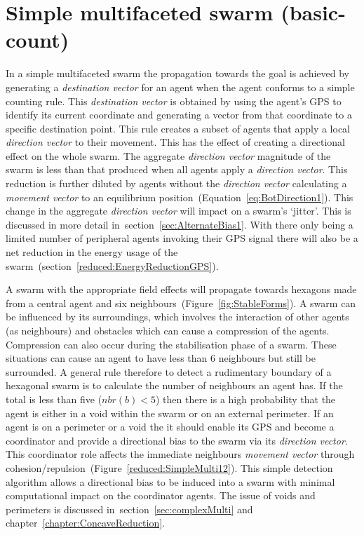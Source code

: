 \section{Simple multifaceted swarm (basic-count)} 
In a simple multifaceted swarm the propagation towards the goal is achieved by generating a \textit{destination vector} for an agent when the agent conforms to a simple counting rule. This \textit{destination vector} is obtained by using the agent's GPS to identify its current coordinate and generating a vector from that coordinate to a specific destination point. This rule creates a subset of agents that apply a local \textit{direction vector} to their movement. This has the effect of creating a directional effect on the whole swarm. The aggregate \textit{direction vector} magnitude of the swarm is less than that produced when all agents apply a \textit{direction vector}. This reduction is further diluted by agents without the \textit{direction vector} calculating a \textit{movement vector} to an equilibrium position~(Equation~\ref{eq:BotDirection1}). This change in the aggregate \textit{direction vector} will impact on a swarm's `jitter'. This is discussed in more detail in~section~\ref{sec:AlternateBias1}. With there only being a limited number of peripheral agents invoking their GPS signal there will also be a net reduction in the energy usage of the swarm~(section~\ref{reduced:EnergyReductionGPS}).

A swarm with the appropriate field effects will propagate towards hexagons made from a central agent and six neighbours~(Figure~\ref{fig:StableForms}). A swarm can be influenced by its surroundings, which involves the interaction of other agents (as neighbours) and obstacles which can cause a compression of the agents. Compression can also occur during the stabilisation phase of a swarm. These situations can cause an agent to have less than 6 neighbours but still be surrounded. A general rule therefore to detect a rudimentary boundary of a hexagonal swarm is to calculate the number of neighbours an agent has. If the total is less than five ($nbr(b) < 5$) then there is a high probability that the agent is either in a void within the swarm or on an external perimeter. If an agent is on a perimeter or a void the it should enable its GPS and become a coordinator and provide a directional bias to the swarm via its \textit{direction vector}. This coordinator role affects the immediate neighbours \textit{movement vector} through cohesion/repulsion~(Figure~\ref{reduced:SimpleMulti12}). This simple detection algorithm allows a directional bias to be induced into a swarm with minimal computational impact on the coordinator agents. The issue of voids and perimeters is discussed in~section~\ref{sec:complexMulti} and chapter~\ref{chapter:ConcaveReduction}.

